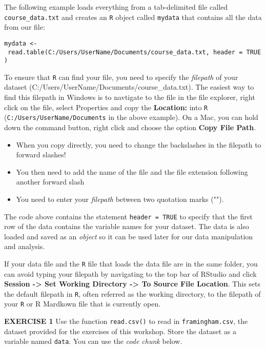 \documentclass[
]{article}
\begin{document}
The following example loads everything from a tab-delimited file called
\texttt{course\_data.txt} and creates an \texttt{R} object called
\texttt{mydata} that contains all the data from our file:

\texttt{mydata\ \textless{}-\ read.table(\textquotesingle{}C:/Users/UserName/Documents/course\_data.txt\textquotesingle{},\ header\ =\ TRUE)}

To ensure that \texttt{R} can find your file, you need to specify the
\emph{filepath} of your dataset
(C:/Users/UserName/Documents/course\_data.txt). The easiest way to find
this filepath in Windows is to navtigate to the file in the file
explorer, right click on the file, select Properties and copy the
\textbf{Location:} into \texttt{R} (\texttt{C:/Users/UserName/Documents}
in the above example). On a Mac, you can hold down the command button,
right click and choose the option \textbf{Copy File Path}.

\begin{itemize}
\item
  When you copy directly, you need to change the backslashes in the
  filepath to forward slashes!
\item
  You then need to add the name of the file and the file extension
  following another forward slash
\item
  You need to enter your \emph{filepath} between two quotation marks
  ("").
\end{itemize}

The code above contains the statement \texttt{header\ =\ TRUE} to
specify that the first row of the data contains the variable names for
your dataset. The data is also loaded and saved as an \emph{object} so
it can be used later for our data manipulation and analysis.

If your data file and the \texttt{R} file that loads the data file are
in the same folder, you can avoid typing your filepath by navigating to
the top bar of RStudio and click \textbf{Session -\textgreater{} Set
Working Directory -\textgreater{} To Source File Location}. This sets
the default filepath in \texttt{R}, often referred as the working
directory, to the filepath of your \texttt{R} or R Mardkown file that is
currently open.

\textbf{EXERCISE 1} Use the function \texttt{read.csv()} to read in
\texttt{framingham.csv}, the dataset provided for the exercises of this
workshop. Store the dataset as a variable named \texttt{data}. You can
use the \emph{code chunk} below.
\end{document}
